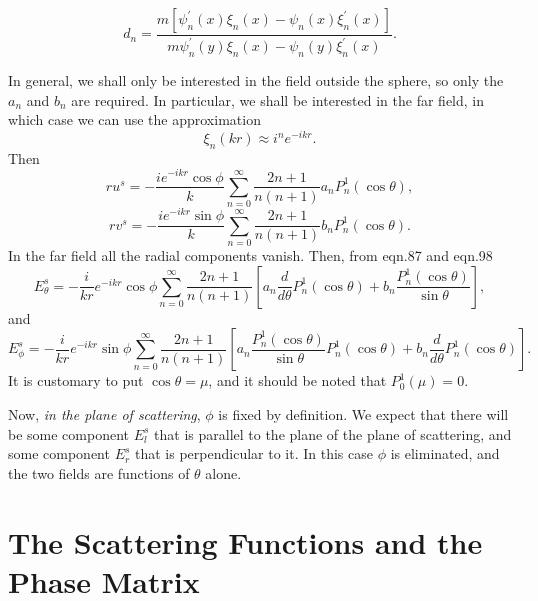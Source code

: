 \documentclass[12pt]{article}
\begin{document}
\begin{equation}
d_n=\frac{ m[\psi^\prime_n(x)\xi_n(x)- \psi_n(x) \xi^\prime_n(x)]}{
   m \psi^\prime_n(y) \xi_n(x)- \psi_n(y) \xi^\prime_n(x)}.
\end{equation}

In general, we shall only be interested in the field outside the sphere, so only the $a_n$ and $b_n$ are required. In particular, we shall be interested in the far field, in which case we can use the approximation
\begin{equation}
\xi_n(kr) \approx i^n e^{-ikr}.
\end{equation}
Then
\begin{equation}
r u^s=-\frac{ i e^{-ikr} \cos \phi}{k}
\sum_{n=0}^\infty 
\frac{2n+1}{n(n+1)} a_n
P^1_n(\cos \theta),
\end{equation}
\begin{equation}
r v^s=-\frac{ i e^{-ikr} \sin \phi}{k}
\sum_{n=0}^\infty 
\frac{2n+1}{n(n+1)} b_n
P^1_n(\cos \theta).
\end{equation}
In the far field all the radial components vanish.
Then, from eqn.87 and eqn.98
\begin{equation}
E^s_\theta=-\frac{i}{kr} e^{-ikr} \cos \phi \sum_{n=0}^\infty
\frac{2n+1}{n(n+1)}
\left \lbrack a_n \frac{d}{d \theta} P^1_n( \cos \theta)
 +b_n \frac{P^1_n(\cos \theta)}{ \sin \theta} \right \rbrack,
\end{equation}
and
\begin{equation}
E^s_\phi=-\frac{i}{kr} e^{-ikr} \sin \phi \sum_{n=0}^\infty
\frac{2n+1}{n(n+1)}
\left \lbrack a_n \frac{P^1_n( \cos \theta)}{\sin \theta} P^1_n( \cos \theta)
 +b_n \frac{ d}{ d \theta} P^1_n(\cos \theta) \right \rbrack.
\end{equation}
It is customary to put $\cos \theta=\mu$, and it should be noted that $P^1_0(\mu)=0.$ 

Now, {\it in the plane of scattering}, $\phi$ is fixed by definition. We expect that there will be some component $E^s_l$ that is parallel to the plane of the plane of scattering, and some component $E^s_r$ that is perpendicular to it. In this case $\phi$ is eliminated, and the two fields are functions of $\theta$ alone.

\section{The Scattering Functions and the Phase Matrix}
\end{document}
